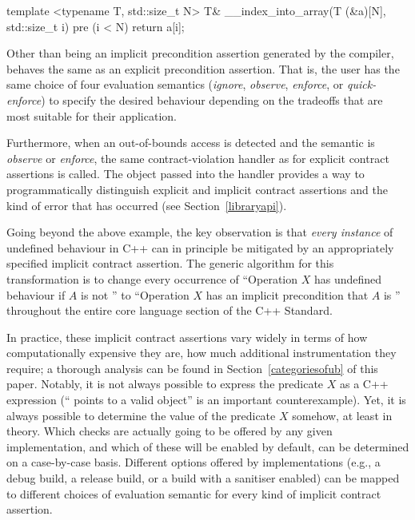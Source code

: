 \begin{codeblock}
template <typename T, std::size_t N>
T& __index_into_array(T (&a)[N], std::size_t i)
pre (i < N) {
  return a[i];
}
\end{codeblock}

Other than being an implicit precondition assertion generated by the compiler,  behaves the same as an explicit precondition assertion. That is, the user has the same choice of four evaluation semantics (\emph{ignore}, \emph{observe}, \emph{enforce}, or \emph{quick-enforce}) to specify the desired behaviour depending on the tradeoffs that are most suitable for their application.

Furthermore, when an out-of-bounds access is detected and the semantic is \emph{observe} or \emph{enforce}, the same contract-violation handler as for explicit contract assertions is called. The  object passed into the handler provides a way to programmatically distinguish explicit and implicit contract assertions and the kind of error that has occurred (see Section~\ref{libraryapi}).

Going beyond the above example, the key observation is that \emph{every instance} of undefined behaviour in C++ can in principle be mitigated by an appropriately specified implicit contract assertion. The generic algorithm for this transformation is to change every occurrence of “Operation $X$ has undefined behaviour if $A$ is not '' to ``Operation $X$ has an implicit precondition that $A$ is '' throughout the entire core language section of the C++ Standard.

In practice, these implicit contract assertions vary widely in terms of how computationally expensive they are, how much additional instrumentation they require; a thorough analysis can be found in Section~\ref{categoriesofub} of this paper. Notably, it is not always possible to express the predicate $X$ as a C++ expression (`` points to a valid object'' is an important counterexample). Yet, it is always possible to determine the value of the predicate $X$ somehow, at least in theory. Which checks are actually going to be offered by any given implementation, and which of these will be enabled by default, can be determined on a case-by-case basis. Different options offered by implementations (e.g., a debug build, a release build, or a build with a sanitiser enabled) can be mapped to different choices of evaluation semantic for every kind of implicit contract assertion. %

